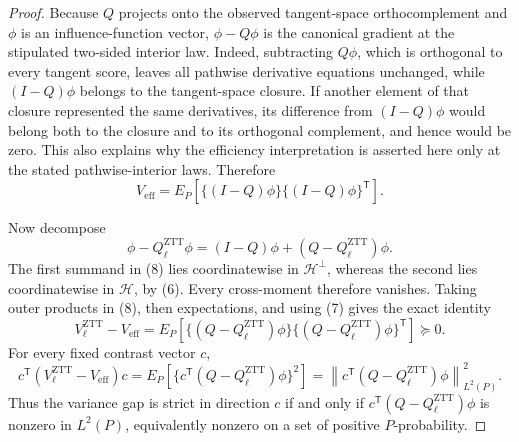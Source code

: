 \documentclass{article}
\begin{document}
\begin{proof}
Because \(Q\) projects onto the observed tangent-space orthocomplement and \(\phi\) is an influence-function vector, \(\phi-Q\phi\) is the canonical gradient at the stipulated two-sided interior law.  Indeed, subtracting \(Q\phi\), which is orthogonal to every tangent score, leaves all pathwise derivative equations unchanged, while \((I-Q)\phi\) belongs to the tangent-space closure.  If another element of that closure represented the same derivatives, its difference from \((I-Q)\phi\) would belong both to the closure and to its orthogonal complement, and hence would be zero.  This also explains why the efficiency interpretation is asserted here only at the stated pathwise-interior laws.  Therefore
\[
V_{\mathrm{eff}}=E_P\!\left[\{(I-Q)\phi\}\{(I-Q)\phi\}^{\mathsf T}\right].               \tag{7}
\]

Now decompose
\[
\phi-Q_\ell^{\mathrm{ZTT}}\phi
=(I-Q)\phi+(Q-Q_\ell^{\mathrm{ZTT}})\phi.                                                   \tag{8}
\]
The first summand in (8) lies coordinatewise in \(\mathcal H^\perp\), whereas the second lies coordinatewise in \(\mathcal H\), by (6).  Every cross-moment therefore vanishes.  Taking outer products in (8), then expectations, and using (7) gives the exact identity
\[
V_\ell^{\mathrm{ZTT}}-V_{\mathrm{eff}}
=E_P\!\left[\{(Q-Q_\ell^{\mathrm{ZTT}})\phi\}
             \{(Q-Q_\ell^{\mathrm{ZTT}})\phi\}^{\mathsf T}\right]\succeq0.              \tag{9}
\]
For every fixed contrast vector \(c\),
\[
c^{\mathsf T}(V_\ell^{\mathrm{ZTT}}-V_{\mathrm{eff}})c
=E_P\!\left[\{c^{\mathsf T}(Q-Q_\ell^{\mathrm{ZTT}})\phi\}^2\right]
=\left\|c^{\mathsf T}(Q-Q_\ell^{\mathrm{ZTT}})\phi\right\|_{L^2(P)}^2.                  \tag{10}
\]
Thus the variance gap is strict in direction \(c\) if and only if \(c^{\mathsf T}(Q-Q_\ell^{\mathrm{ZTT}})\phi\) is nonzero in \(L^2(P)\), equivalently nonzero on a set of positive \(P\)-probability.


\end{proof}
\end{document}
